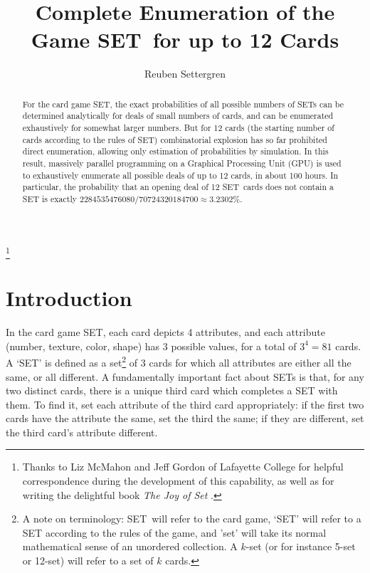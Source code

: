 \documentclass[10pt]{amsart}
\newcommand{\SETb}{SET\texttrademark\ } %
\newcommand{\SET}{SET\texttrademark}  %
\begin{document}
\title[SET Enumeration]{Complete Enumeration of the Game \SETb for up to 12 Cards}
\author[Settergren]{Reuben Settergren}

\thanks{Thanks to Liz McMahon and Jeff Gordon of Lafayette College for helpful
  correspondence during the development of this capability, as well as for
  writing the delightful book {\em The Joy of Set} \cite{JOS}.}

\maketitle

\begin{abstract}
For the card game \SET, the exact probabilities of all possible numbers of SETs
can be determined analytically for deals of small numbers of cards, and can be
enumerated exhaustively for somewhat larger numbers. But for 12 cards (the
starting number of cards according to the rules of \SET) combinatorial explosion
has so far prohibited direct enumeration, allowing only estimation of
probabilities by simulation. In this result, massively parallel programming on a
Graphical Processing Unit (GPU) is used to exhaustively enumerate all possible
deals of up to 12 cards, in about 100 hours. In particular, the probability that
an opening deal of 12 \SETb cards does not contain a SET is exactly
$2284535476080/70724320184700 \approx 3.2302\%$.
\end{abstract}

\section{Introduction}
In the card game \SET\cite{SET}, each card depicts 4 attributes, and each
attribute (number, texture, color, shape) has 3 possible values, for a total of
$3^4=81$ cards. A `SET' is defined as a set\footnote{A note on terminology:
  \SETb will refer to the card game, `SET' will refer to a SET according to the
  rules of the game, and 'set' will take its normal mathematical sense of an
  unordered collection. A $k$-set (or for instance 5-set or 12-set) will refer
  to a set of $k$ cards.} of 3 cards for which all attributes are either all the
same, or all different. A fundamentally important fact about SETs is that, for
any two distinct cards, there is a unique third card which completes a SET with
them. To find it, set each attribute of the third card appropriately: if the
first two cards have the attribute the same, set the third the same; if they are
different, set the third card's attribute different.
\end{document}
